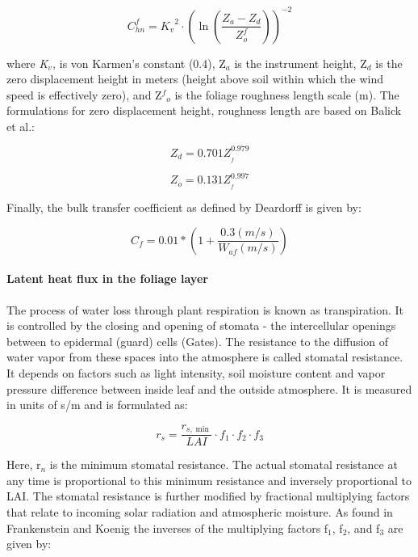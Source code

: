 \begin{equation}
C_{hn}^f = {K_v}^2 \cdot {\left( {\ln \left( {\frac{{{Z_a} - {Z_d}}}{{Z_o^f}}} \right)} \right)^{ - 2}}
\end{equation}

where \emph{K\(_{v}\),} is von Karmen's constant (0.4), Z\(_{a}\) is the instrument height, Z\(_{d}\) is the zero displacement height in meters (height above soil within which the wind speed is effectively zero), and Z\(^{f}\)\(_{o}\) is the foliage roughness length scale (m). The formulations for zero displacement height, roughness length are based on Balick et al.:

\begin{equation}
{Z_d} = 0.701Z_{_f}^{0.979}
\end{equation}

\begin{equation}
{Z_o} = 0.131Z_{_f}^{0.997}
\end{equation}

Finally, the bulk transfer coefficient as defined by Deardorff is given by:

\begin{equation}
{C_f} = 0.01*\left( {1 + \frac{{0.3(m/s)}}{{{W_{af}}(m/s)}}} \right)
\end{equation}

\paragraph{Latent heat flux in the foliage layer}\label{latent-heat-flux-in-the-foliage-layer}

The process of water loss through plant respiration is known as transpiration. It is controlled by the closing and opening of stomata - the intercellular openings between to epidermal (guard) cells (Gates). The resistance to the diffusion of water vapor from these spaces into the atmosphere is called stomatal resistance. It depends on factors such as light intensity, soil moisture content and vapor pressure difference between inside leaf and the outside atmosphere. It is measured in units of s/m and is formulated as:

\begin{equation}
{r_s} = \frac{{{r_{s,\min }}}}{{LAI}} \cdot {f_1} \cdot {f_2} \cdot {f_3}
\end{equation}

Here, r\(_{n}\) is the minimum stomatal resistance. The actual stomatal resistance at any time is proportional to this minimum resistance and inversely proportional to LAI. The stomatal resistance is further modified by fractional multiplying factors that relate to incoming solar radiation and atmospheric moisture. As found in Frankenstein and Koenig the inverses of the multiplying factors f\(_{1}\), f\(_{2}\), and f\(_{3}\) are given by:

